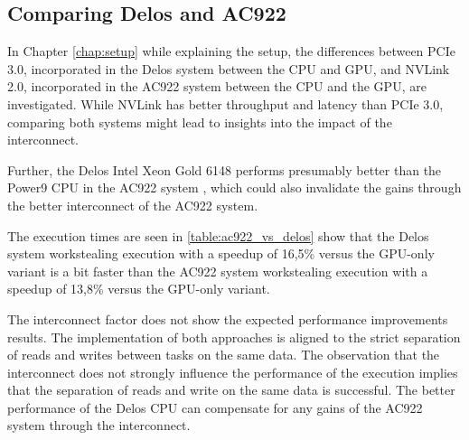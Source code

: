 \subsection{Comparing Delos and AC922}
In Chapter \ref{chap:setup} while explaining the setup, the differences between PCIe 3.0, incorporated in the Delos system between the CPU and GPU, and NVLink 2.0, incorporated in the AC922 system between the CPU and the GPU, are investigated. While NVLink has better throughput and latency than PCIe 3.0, comparing both systems might lead to insights into the impact of the interconnect.

Further, the Delos Intel Xeon Gold 6148 performs presumably better than the Power9 CPU in the AC922 system \cite{POWER9BenchmarksVs}, which could also invalidate the gains through the better interconnect of the AC922 system.



The execution times are seen in \ref{table:ac922_vs_delos} show that the Delos system workstealing execution with a speedup of 16,5\% versus the GPU-only variant is a bit faster than the AC922 system workstealing execution with a speedup of 13,8\% versus the GPU-only variant.

The interconnect factor does not show the expected performance improvements results. The implementation of both approaches is aligned to the strict separation of reads and writes between tasks on the same data. The observation that the interconnect does not strongly influence the performance of the execution implies that the separation of reads and write on the same data is successful. The better performance of the Delos CPU can compensate for any gains of the AC922 system through the interconnect.



